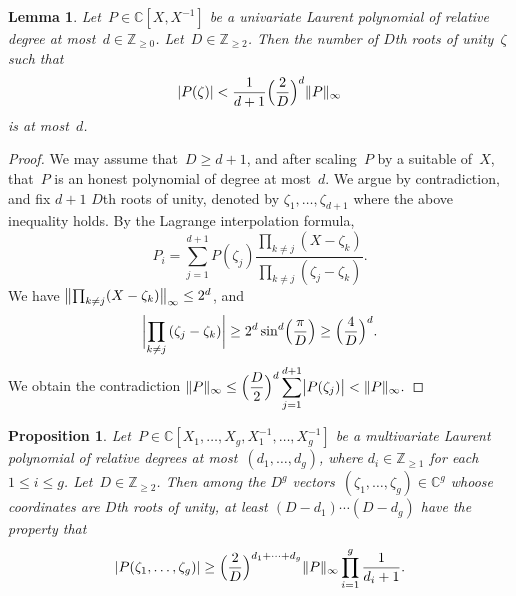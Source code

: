 \documentclass[12pt,oneside]{amsart}
\numberwithin{equation}{section}
\newtheorem{prop}[equation]{Proposition}
\newtheorem{lem}[equation]{Lemma}
\theoremstyle{definition}
\newcommand{\Z}{\mathbb{Z}}
\newcommand{\C}{\mathbb{C}}
\DeclarePairedDelimiter{\abs}{|}{|}
\DeclarePairedDelimiter{\paren}{(}{)}
\DeclarePairedDelimiter{\norm}{\|}{\|}
\begin{document}
\begin{lem}
  \label{lem:t-dim1}
  Let~$P\in \C[X, X^{-1}]$ be a univariate Laurent polynomial of relative
  degree at most~$d\in \Z_{\geq 0}$.  Let~$D\in \Z_{\geq 2}$. Then the number
  of $D$th roots of unity~$\zeta$ such that
  \begin{displaymath}
    \abs{P(\zeta)}< \frac{1}{d+1} \paren[\Big]{\frac{2}{D}}^{d} \norm{P}_\infty
  \end{displaymath}
  is at most~$d$.
\end{lem}

\begin{proof}
  We may assume that~$D\geq d+1$, and after scaling~$P$ by a suitable of~$X$,
  that~$P$ is an honest polynomial of degree at most~$d$. We argue by
  contradiction, and fix $d+1$ $D$th roots of unity, denoted by
  $\zeta_1,\ldots,\zeta_{d+1}$ where the above inequality holds. By the
  Lagrange interpolation formula,
  \begin{displaymath}
    P_i = \sum_{j=1}^{d+1} P(\zeta_j) \frac{\prod_{k\neq j} (X - \zeta_k)}{\prod_{k\neq j}(\zeta_j - \zeta_k)}.
  \end{displaymath}
  We have $\norm[\big]{\prod_{k\neq j} (X - \zeta_k)}_\infty \leq 2^{d}$, and
  \begin{displaymath}
    \abs[\bigg]{\prod_{k\neq j}{(\zeta_j - \zeta_k)}} \geq 2^{d} \sin^{d}\paren[\Big]{\frac{\pi}{D}} \geq \paren[\Big]{\frac{4}{D}}^{d}.
  \end{displaymath}
  We obtain the contradiction
  $\displaystyle\norm{P}_\infty \leq \paren[\Big]{\frac{D}{2}}^{d} \sum_{j=1}^{d+1} \abs[\big]{P(\zeta_j)}
  < \norm{P}_\infty.$ \qedhere
\end{proof}

\begin{prop}
  \label{prop:t-dimg}
  Let~$P\in \C[X_1,\ldots,X_g,X_1^{-1},\ldots,X_g^{-1}]$ be a multivariate
  Laurent polynomial of relative degrees at most~$(d_1,\ldots,d_g)$, where
  $d_i\in \Z_{\geq 1}$ for each $1\leq i\leq g$. Let~$D\in \Z_{\geq 2}$. Then
  among the $D^g$ vectors~$(\zeta_1,\ldots,\zeta_g)\in \C^g$ whoose coordinates are $D$th roots of
  unity, at least $(D-d_1)\cdots (D-d_g)$ have the property that
  \begin{displaymath}
    \abs{P(\zeta_1,\ldots,\zeta_g)}\geq \paren[\Big]{\frac{2}{D}}^{d_1+\cdots+d_g} \norm{P}_\infty \prod_{i=1}^g \frac{1}{d_i+1}.
  \end{displaymath}
\end{prop}
\end{document}
